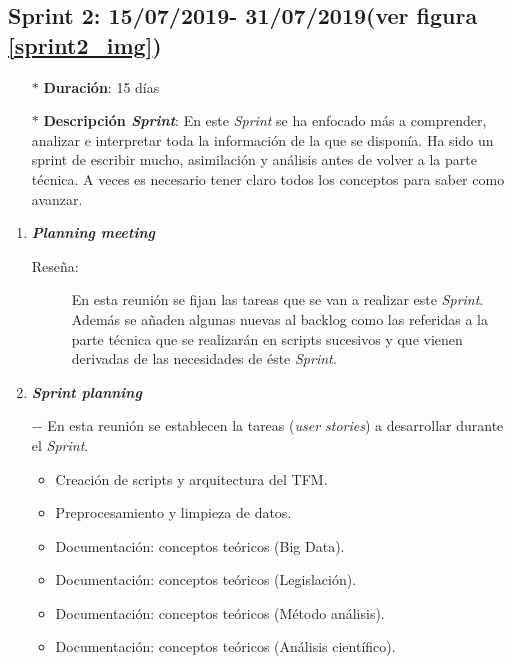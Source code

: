 \subsection{Sprint 2: 15/07/2019- 31/07/2019(ver figura \ref{sprint2_img})}\label{sprint2}
\begin{itemize}
\item[$\ast$] \textbf{Duración}:  15 días
\item[$\ast$] \textbf{Descripción \textit{Sprint}}: En este \textit{Sprint} se ha enfocado más a comprender, analizar e interpretar toda la información de la que se disponía. Ha sido un sprint de escribir mucho, asimilación y análisis antes de volver a la parte técnica. A veces es necesario tener claro todos los conceptos para saber como avanzar. 
\end{itemize}
\begin{enumerate}
\item \textbf{\textit{Planning meeting}}
\begin{description}
	\item[Reseña:] En esta reunión se fijan las tareas que se van a realizar este \textit{Sprint}. Además se añaden algunas nuevas al backlog como las referidas a la parte técnica que se realizarán en scripts sucesivos y que vienen derivadas de las necesidades de éste \textit{Sprint}.
\end{description}
\item \textbf{\textit{Sprint planning}}
	\item[$-$] En esta reunión se establecen la tareas (\textit{user stories}) a desarrollar durante el \textit{Sprint}. 
\begin{itemize}
	\item Creación de scripts y arquitectura del TFM.
	\item Preprocesamiento y limpieza de datos.
	\item Documentación: conceptos teóricos (Big Data).
	\item Documentación: conceptos teóricos (Legislación).
	\item Documentación: conceptos teóricos (Método análisis).
	\item Documentación: conceptos teóricos (Análisis científico).


\end{itemize}
\end{enumerate}
